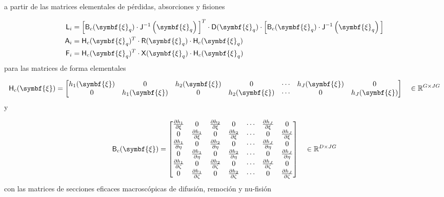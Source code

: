 \documentclass[
  12pt,
  a4paper,
  table]{scrbook}
\theoremstyle{plain}
\theoremstyle{definition}
\theoremstyle{plain}
\theoremstyle{plain}
\theoremstyle{remark}
\begin{document}
a partir de las matrices elementales de pérdidas, absorciones y fisiones

\[
\begin{aligned}
\mat{L}_i &= \Big[ \mat{B}_c(\symbf{\xi}_q) \cdot \mat{J}^{-1}\left(\symbf{\xi}_q\right) \Big]^T \cdot \mat{D}(\symbf{\xi}_q) \cdot \Big[ \mat{B}_c(\symbf{\xi}_q) \cdot \mat{J}^{-1}\left(\symbf{\xi}_q\right) \Big] \\
\mat{A}_i &= \mat{H}_c(\symbf{\xi}_q)^T \cdot \mat{R}(\symbf{\xi}_q) \cdot \mat{H}_c(\symbf{\xi}_q) \\
\mat{F}_i &= \mat{H}_c(\symbf{\xi}_q)^T \cdot \mat{X}(\symbf{\xi}_q) \cdot \mat{H}_c(\symbf{\xi}_q)
\end{aligned}
\] para las matrices de forma elementales

\[
\mat{H}_c(\symbf{\xi}) =
\begin{bmatrix}
h_1(\symbf{\xi}) & 0 & h_2(\symbf{\xi}) & 0 & \cdots & h_J(\symbf{\xi}) & 0 \\
0 & h_1(\symbf{\xi}) & 0 & h_2(\symbf{\xi}) & \cdots & 0 & h_J(\symbf{\xi}) \\
\end{bmatrix} \quad \in \mathbb{R}^{G \times JG}
\] y

\[
\mat{B}_c(\symbf{\xi}) =
\begin{bmatrix}
\frac{\partial h_1}{\partial \xi}   & 0 & \frac{\partial h_2}{\partial \xi}   & 0  & \cdots & \frac{\partial h_J}{\partial \xi} & 0 \\
0 & \frac{\partial h_1}{\partial \xi}  & 0 & \frac{\partial h_2}{\partial \xi} &  \cdots & 0 & \frac{\partial h_J}{\partial \xi}  \\
\frac{\partial h_1}{\partial \eta}  & 0 & \frac{\partial h_2}{\partial \eta}  & 0 & \cdots & \frac{\partial h_J}{\partial \eta} & 0 \\
0 & \frac{\partial h_1}{\partial \eta}  & 0 & \frac{\partial h_2}{\partial \eta}  & \cdots & 0 & \frac{\partial h_J}{\partial \eta} \\
\frac{\partial h_1}{\partial \zeta} & 0 & \frac{\partial h_2}{\partial \zeta} & 0 & \cdots & \frac{\partial h_J}{\partial \zeta} & 0 \\
0 & \frac{\partial h_1}{\partial \zeta} & 0 & \frac{\partial h_2}{\partial \zeta}  & \cdots & 0 & \frac{\partial h_J}{\partial \zeta} \\
\end{bmatrix} \quad \in \mathbb{R}^{D \times JG}
\] con las matrices de secciones eficaces macroscópicas de difusión,
remoción y nu-fisión
\end{document}
